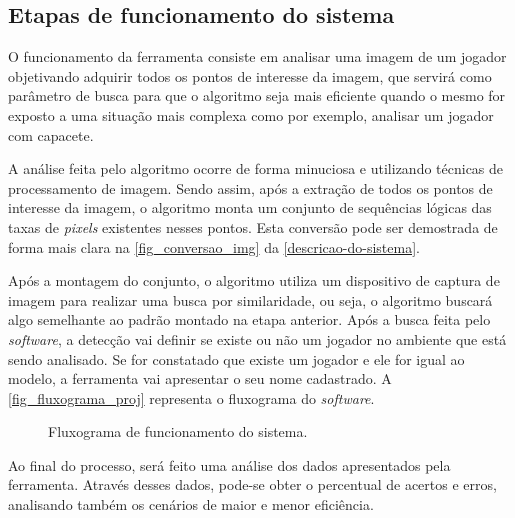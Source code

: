 \subsection{{Etapas de funcionamento do sistema}}

O funcionamento da ferramenta consiste em analisar uma imagem de um jogador objetivando adquirir todos os pontos de interesse da imagem, que servirá como parâmetro de busca para que o algoritmo seja mais eficiente quando o mesmo for exposto a uma situação mais complexa como por exemplo, analisar um jogador com capacete.

A análise feita pelo algoritmo ocorre de forma minuciosa e utilizando técnicas de processamento de imagem. Sendo assim, após a extração de todos os pontos de interesse da imagem, o algoritmo monta um conjunto de sequências lógicas das taxas de \textit{pixels} existentes nesses pontos. Esta conversão pode ser demostrada de forma mais clara na \autoref{fig_conversao_img} da \autoref{descricao-do-sistema}.

Após a montagem do conjunto, o algoritmo utiliza um dispositivo de captura de imagem para realizar uma busca por similaridade, ou seja, o algoritmo buscará algo semelhante ao padrão montado na etapa anterior. Após a busca feita pelo \textit{software}, a detecção vai definir se existe ou não um jogador no ambiente que está sendo analisado. Se for constatado que existe um jogador e ele for igual ao modelo, a ferramenta vai apresentar o seu nome cadastrado. A \autoref{fig_fluxograma_proj} representa o fluxograma do \textit{software}.

\begin{figure}[h]
	\caption{\label{fig_fluxograma_proj}Fluxograma de funcionamento do sistema.}
	\begin{center}
	\end{center}
	\centering {}
\end{figure}

Ao final do processo, será feito uma análise dos dados apresentados pela ferramenta. Através desses dados, pode-se obter o percentual de acertos e erros, analisando também os cenários de maior e menor eficiência.